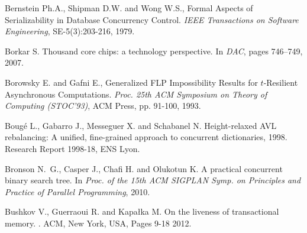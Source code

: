 \begin{thebibliography}{99}
{
Bernstein Ph.A., Shipman D.W. and Wong W.S., 
Formal Aspects of Serializability in Database Concurrency Control. 
{\it IEEE Transactions on Software Engineering}, SE-5(3):203-216, 1979. 


Borkar S.
\newblock Thousand core chips: a technology perspective.
\newblock In {\em DAC}, pages 746--749, 2007.





Borowsky E. and Gafni E., 
Generalized FLP Impossibility Results for $t$-Resilient Asynchronous
Computations.
{\it Proc. 25th ACM  Symposium on Theory of Computing (STOC'93)}, 
ACM Press, pp. 91-100, 1993.



Boug\'e L., Gabarro J., Messeguer X. and Schabanel N.
\newblock Height-relaxed {AVL} rebalancing: A unified, fine-grained approach to
  concurrent dictionaries, 1998.
\newblock Research Report 1998-18, ENS Lyon.






Bronson N.~G., Casper J., Chafi H. and Olukotun K.
\newblock A practical concurrent binary search tree.
\newblock In {\em Proc. of the 15th ACM SIGPLAN Symp. on Principles and
  Practice of Parallel Programming}, 2010.




Bushkov V., Guerraoui R. and Kapa\l{}ka M.
\newblock On the liveness of transactional memory.
.
 ACM, New York, USA, Pages 9-18 2012.



}
\end{thebibliography}
